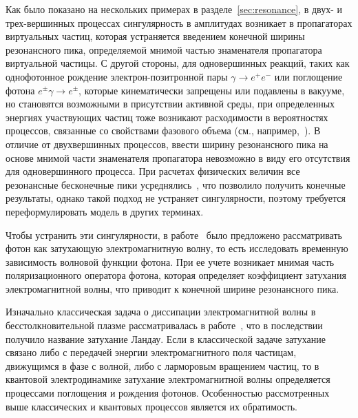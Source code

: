 Как было показано на нескольких примерах в разделе~\ref{sec:resonance}, в двух- 
и трех-вершинных процессах сингулярность в амплитудах возникает в пропагаторах 
виртуальных частиц, которая устраняется введением конечной ширины резонансного 
пика, определяемой мнимой частью знаменателя пропагатора виртуальной частицы. С 
другой 
стороны, для одновершинных реакций, таких как однофотонное 
рождение электрон-позитронной пары $\gamma\to e^+e^-$ или поглощение фотона 
$e^{\pm}\gamma\to e^{\pm}$, которые кинематически запрещены или подавлены в 
вакууме, но становятся возможными в присутствии активной среды, при 
определенных энергиях участвующих частиц тоже возникают 
расходимости в вероятностях процессов, связанные со свойствами фазового объема 
(см., 
например,~\cite{Klepikov:1954,Sturrock:1971,Tademaru:1973,Daugherty:1983,Shabad:1988}).
В отличие от двухвершинных процессов, ввести ширину резонансного пика на основе 
мнимой части знаменателя пропагатора невозможно в виду его отсутствия для 
одновершинного процесса.  При расчетах 
физических величин все резонансные бесконечные пики 
усреднялись~\cite{Baier:2007}, что позволило получить конечные результаты, 
однако такой подход не устраняет сингулярности, поэтому требуется 
переформулировать модель в других терминах. 

Чтобы устранить эти сингулярности, в работе~\cite{Shabad:1988} было предложено  
рассматривать фотон как затухающую электромагнитную волну, то есть исследовать 
временную зависимость волновой функции фотона.
При ее учете возникает мнимая часть поляризационного оператора фотона, которая 
определяет коэффициент затухания электромагнитной волны, что приводит к 
конечной ширине резонансного пика.

Изначально классическая задача о диссипации электромагнитной волны  в 
бесстолкновительной плазме 
рассматривалась в работе~\cite{Landau:1946}, что в последствии получило 
название затухание Ландау. Если в классической задаче затухание связано либо с 
передачей энергии электромагнитного поля частицам, движущимся в фазе с волной, 
либо с ларморовым вращением частиц, то в квантовой электродинамике затухание 
электромагнитной волны определяется процессами 
поглощения и рождения фотонов. Особенностью рассмотренных выше классических и 
квантовых процессов является их обратимость.

